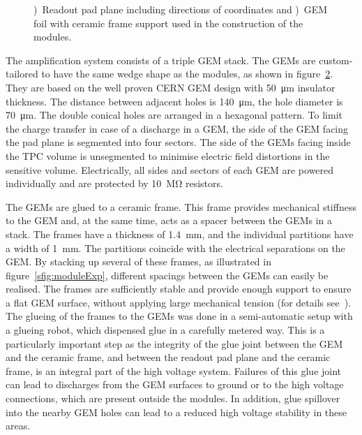 \documentclass[preprint]{elsarticle}
\begin{document}
\begin{figure}[tb]
\begin{subfigure}[b]{0.47\textwidth}
\iftoggle{blackandwhite}{\texttt{[image: figures/padplane\_padside\_coordinatesBW.jpg]}}{\texttt{[image: figures/padplane\_padside\_coordinates.pdf]}}
\caption{}
\label{sfig:modulePads}
\end{subfigure}
\hfill
\begin{subfigure}[b]{0.47\textwidth}
\iftoggle{blackandwhite}{\texttt{[image: figures/GemGridBW.jpg]}}{\texttt{[image: figures/GemGrid.jpg]}}
\caption{}
\label{sfig:moduleGEM}
\end{subfigure}
\caption [Readout Module GEM]{\small \protect{})~Readout pad plane including directions of coordinates and \protect{})~GEM foil with ceramic frame support used in the construction of the modules.}
\label{fig:moduleParts}
\end{figure}


The amplification system consists of a triple GEM stack. The GEMs are custom-tailored to have the same wedge shape as the modules, as shown in figure~\ref{sfig:moduleGEM}. They are based on the well proven CERN GEM design with \SI{50}{\um} insulator thickness. The distance between adjacent holes is \SI{140}{\um}, the hole diameter is \SI{70}{\um}. The double conical holes are arranged in a hexagonal pattern. To limit the charge transfer in case of a discharge in a GEM, the side of the GEM facing the pad plane is segmented into four sectors. 
The side of the GEMs facing inside the TPC volume is unsegmented to minimise electric field distortions in the sensitive volume. Electrically, all sides and sectors of each GEM are powered individually and are protected by \SI{10}{\Mohm} resistors.

The GEMs are glued to a ceramic frame. This frame provides mechanical stiffness to the GEM and, at the same time, acts as a spacer between the GEMs in a stack. The frames have a thickness of \SI{1.4}{\mm}, and the individual partitions have a width of \SI{1}{\mm}. The partitions coincide with the electrical separations on the GEM. 
By stacking up several of these frames, as illustrated in figure~\ref{sfig:moduleExp}, different spacings between the GEMs can easily be realised. The frames are sufficiently stable and provide enough support to ensure a flat GEM surface, without applying large mechanical tension (for details see~\cite{1748-0221-8-12-P12009,HallermannPhD}). The glueing of the frames to the GEMs was done in a semi-automatic setup with a glueing robot, which dispensed glue in a carefully metered way. This is a particularly important step as the integrity of the glue joint between the GEM and the ceramic frame, and between the readout pad plane and the ceramic frame, is an integral part of the high voltage system. 
Failures of this glue joint can lead to discharges from the GEM surfaces to ground or to the high voltage connections, which are present outside the modules. In addition, glue spillover into the nearby GEM holes can lead to a reduced high voltage stability in these areas.
\end{document}

